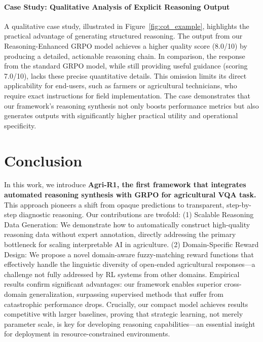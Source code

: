 \documentclass[11pt]{article}
\begin{document}
\paragraph{Case Study: Qualitative Analysis of Explicit Reasoning Output}

A qualitative case study, illustrated in Figure~\ref{fig:cot_example}, highlights the practical advantage of generating structured reasoning. The output from our Reasoning-Enhanced GRPO model achieves a higher quality score (8.0/10) by producing a detailed, actionable reasoning chain.
In comparison, the response from the standard GRPO model, while still providing useful guidance (scoring 7.0/10), lacks these precise quantitative details. This omission limits its direct applicability for end-users, such as farmers or agricultural technicians, who require exact instructions for field implementation. The case demonstrates that our framework's reasoning synthesis not only boosts performance metrics but also generates outputs with significantly higher practical utility and operational specificity.




\section{Conclusion}
In this work, we introduce \textbf{Agri-R1, the first framework that integrates automated reasoning synthesis with GRPO for agricultural VQA task.} This approach pioneers a shift from opaque predictions to transparent, step-by-step diagnostic reasoning. Our contributions are twofold: (1) Scalable Reasoning Data Generation: We demonstrate how to automatically construct high-quality reasoning data without expert annotation, directly addressing the primary bottleneck for scaling interpretable AI in agriculture. (2) Domain-Specific Reward Design: We propose a novel domain-aware fuzzy-matching reward functions that effectively handle the linguistic diversity of open-ended agricultural responses—a challenge not fully addressed by RL systems from other domains. Empirical results confirm significant advantages: our framework enables superior cross-domain generalization, surpassing supervised methods that suffer from catastrophic performance drops. Crucially, our compact model achieves results competitive with larger baselines, proving that strategic learning, not merely parameter scale, is key for developing reasoning capabilities—an essential insight for deployment in resource-constrained environments.
\end{document}
